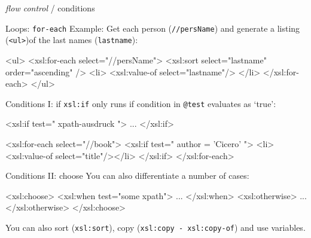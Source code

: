 \begin{frame}{\emph{flow control} / conditions}


\begin{block}{Loops: \texttt{for-each}}
Example: Get each person (\texttt{//persName}) and generate a listing (\texttt{<ul>})of the last names (\texttt{lastname}):
\begin{xmlcode}
<ul>
<xsl:for-each select="//persName">
    <xsl:sort select="lastname" order="ascending" />
    <li> <xsl:value-of select="lastname"/> </li>
</xsl:for-each>
</ul>
\end{xmlcode}
\end{block}

\framebreak

\begin{block}{Conditions I: if}
\texttt{xsl:if} only runs if condition in \texttt{@test} evaluates as `true':
\begin{xmlcode}
<xsl:if test=" xpath-ausdruck "> ... </xsl:if>

<xsl:for-each select="//book">
    <xsl:if test=" author = 'Cicero' ">
        <li><xsl:value-of select="title"/></li>
    </xsl:if>
</xsl:for-each>
\end{xmlcode}
\end{block}

\framebreak

\begin{block}{Conditions II: choose}
You can also differentiate a number of cases:
\begin{xmlcode}
<xsl:choose>
    <xsl:when test="some xpath"> ... </xsl:when>
    <xsl:otherwise> ... </xsl:otherwise>
</xsl:choose>
\end{xmlcode}
\end{block}

You can also sort (\texttt{xsl:sort}), copy (\texttt{xsl:copy - xsl:copy-of}) and use variables. 

\end{frame}

